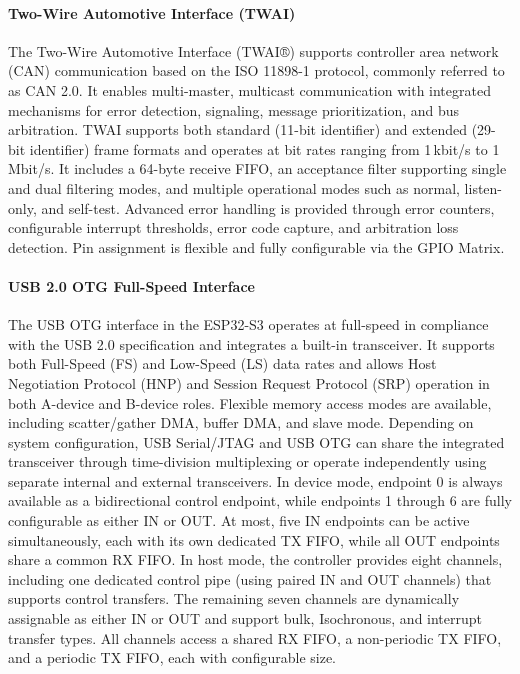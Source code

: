 \paragraph{Two-Wire Automotive Interface (TWAI)}
The Two-Wire Automotive Interface (TWAI®) supports controller area network (CAN) communication based on the ISO 11898-1 protocol, commonly referred to as CAN 2.0. It enables multi-master, multicast communication with integrated mechanisms for error detection, signaling, message prioritization, and bus arbitration. TWAI supports both standard (11-bit identifier) and extended (29-bit identifier) frame formats and operates at bit rates ranging from 1\,kbit/s to 1\,Mbit/s. It includes a 64-byte receive FIFO, an acceptance filter supporting single and dual filtering modes, and multiple operational modes such as normal, listen-only, and self-test. Advanced error handling is provided through error counters, configurable interrupt thresholds, error code capture, and arbitration loss detection. Pin assignment is flexible and fully configurable via the GPIO Matrix.

\paragraph{USB 2.0 OTG Full-Speed Interface}
The USB OTG interface in the ESP32-S3 operates at full-speed in compliance with the USB 2.0 specification and integrates a built-in transceiver. It supports both Full-Speed (FS) and Low-Speed (LS) data rates and allows Host Negotiation Protocol (HNP) and Session Request Protocol (SRP) operation in both A-device and B-device roles. Flexible memory access modes are available, including scatter/gather DMA, buffer DMA, and slave mode. Depending on system configuration, USB Serial/JTAG and USB OTG can share the integrated transceiver through time-division multiplexing or operate independently using separate internal and external transceivers. In device mode, endpoint 0 is always available as a bidirectional control endpoint, while endpoints 1 through 6 are fully configurable as either IN or OUT. At most, five IN endpoints can be active simultaneously, each with its own dedicated TX FIFO, while all OUT endpoints share a common RX FIFO. In host mode, the controller provides eight channels, including one dedicated control pipe (using paired IN and OUT channels) that supports control transfers. The remaining seven channels are dynamically assignable as either IN or OUT and support bulk, Isochronous, and interrupt transfer types. All channels access a shared RX FIFO, a non-periodic TX FIFO, and a periodic TX FIFO, each with configurable size.

